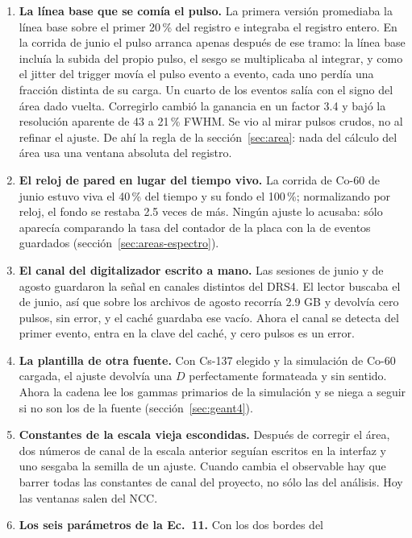 \documentclass[11pt,a4paper]{article}
\begin{document}
\begin{enumerate}
\item \textbf{La línea base que se comía el pulso.} La primera versión
      promediaba la línea base sobre el primer 20\,\% del registro e integraba
      el registro entero. En la corrida de junio el pulso arranca apenas
      después de ese tramo: la línea base incluía la subida del propio pulso,
      el sesgo se multiplicaba al integrar, y como el jitter del trigger
      movía el pulso evento a evento, cada uno perdía una fracción distinta
      de su carga. Un cuarto de los eventos salía con el signo del área dado
      vuelta. Corregirlo cambió la ganancia en un factor 3.4 y bajó la
      resolución aparente de 43 a 21\,\% FWHM. Se vio al mirar pulsos crudos,
      no al refinar el ajuste. De ahí la regla de la
      sección~\ref{sec:area}: nada del cálculo del área usa una ventana
      absoluta del registro.
\item \textbf{El reloj de pared en lugar del tiempo vivo.} La corrida de
      Co-60 de junio estuvo viva el 40\,\% del tiempo y su fondo el 100\,\%;
      normalizando por reloj, el fondo se restaba 2.5 veces de más. Ningún
      ajuste lo acusaba: sólo aparecía comparando la tasa del contador de la
      placa con la de eventos guardados (sección~\ref{sec:areas-espectro}).
\item \textbf{El canal del digitalizador escrito a mano.} Las sesiones de
      junio y de agosto guardaron la señal en canales distintos del DRS4. El
      lector buscaba el de junio, así que sobre los archivos de agosto
      recorría 2.9 GB y devolvía cero pulsos, sin error, y el caché guardaba
      ese vacío. Ahora el canal se detecta del primer evento, entra en la
      clave del caché, y cero pulsos es un error.
\item \textbf{La plantilla de otra fuente.} Con Cs-137 elegido y la
      simulación de Co-60 cargada, el ajuste devolvía una $D$ perfectamente
      formateada y sin sentido. Ahora la cadena lee los gammas primarios de
      la simulación y se niega a seguir si no son los de la fuente
      (sección~\ref{sec:geant4}).
\item \textbf{Constantes de la escala vieja escondidas.} Después de corregir
      el área, dos números de canal de la escala anterior seguían escritos en
      la interfaz y uno sesgaba la semilla de un ajuste. Cuando cambia el
      observable hay que barrer todas las constantes de canal del proyecto,
      no sólo las del análisis. Hoy las ventanas salen del NCC.
\item \textbf{Los seis parámetros de la Ec.~11.} Con los dos bordes del

\end{enumerate}
\end{document}
